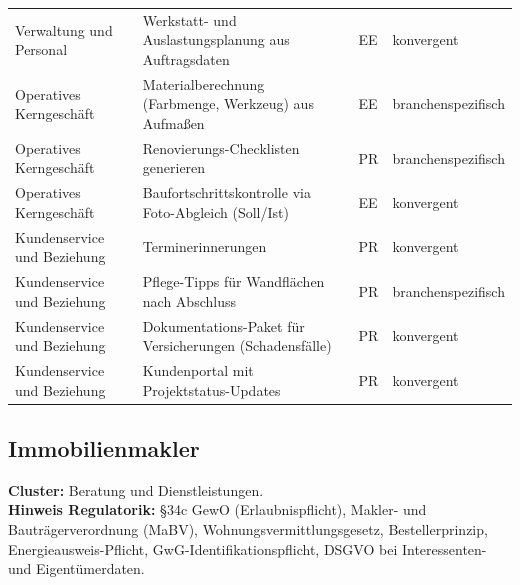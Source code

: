 \documentclass[a4paper,11pt]{article}
\begin{document}
\begin{table}[H]
\begin{tabular}{p{3.3cm}p{7.3cm}p{1cm}p{2.5cm}}
Verwaltung und Personal & Werkstatt- und Auslastungsplanung aus Auftragsdaten & EE & konvergent \\
Operatives Kerngeschäft & Materialberechnung (Farbmenge, Werkzeug) aus Aufmaßen & EE & branchenspezifisch \\
Operatives Kerngeschäft & Renovierungs-Checklisten generieren & PR & branchenspezifisch \\
Operatives Kerngeschäft & Baufortschrittskontrolle via Foto-Abgleich (Soll/Ist) & EE & konvergent \\
Kundenservice und Beziehung & Terminerinnerungen & PR & konvergent \\
Kundenservice und Beziehung & Pflege-Tipps für Wandflächen nach Abschluss & PR & branchenspezifisch \\
Kundenservice und Beziehung & Dokumentations-Paket für Versicherungen (Schadensfälle) & PR & konvergent \\
Kundenservice und Beziehung & Kundenportal mit Projektstatus-Updates & PR & konvergent \\
\bottomrule
\end{tabular}
\end{table}

\subsection*{Immobilienmakler}

\textbf{Cluster:} Beratung und Dienstleistungen. \\
\textbf{Hinweis Regulatorik:} §34c GewO (Erlaubnispflicht), Makler-
und Bauträgerverordnung (MaBV), Wohnungsvermittlungsgesetz,
Bestellerprinzip, Energieausweis-Pflicht, GwG-Identifikationspflicht,
DSGVO bei Interessenten- und Eigentümerdaten.
\end{document}
